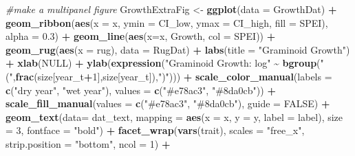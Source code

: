 \documentclass[
]{article}
\newenvironment{Shaded}{\begin{snugshade}}{\end{snugshade}}
\newcommand{\CommentTok}[1]{\textcolor[rgb]{0.56,0.35,0.01}{\textit{#1}}}
\newcommand{\DataTypeTok}[1]{\textcolor[rgb]{0.13,0.29,0.53}{#1}}
\newcommand{\DecValTok}[1]{\textcolor[rgb]{0.00,0.00,0.81}{#1}}
\newcommand{\FloatTok}[1]{\textcolor[rgb]{0.00,0.00,0.81}{#1}}
\newcommand{\KeywordTok}[1]{\textcolor[rgb]{0.13,0.29,0.53}{\textbf{#1}}}
\newcommand{\NormalTok}[1]{#1}
\newcommand{\OperatorTok}[1]{\textcolor[rgb]{0.81,0.36,0.00}{\textbf{#1}}}
\newcommand{\OtherTok}[1]{\textcolor[rgb]{0.56,0.35,0.01}{#1}}
\newcommand{\StringTok}[1]{\textcolor[rgb]{0.31,0.60,0.02}{#1}}
\begin{document}
\begin{Shaded}
\begin{Highlighting}[]
\CommentTok{\#make a multipanel figure}
\NormalTok{GrowthExtraFig \textless{}{-}}\StringTok{ }\KeywordTok{ggplot}\NormalTok{(}\DataTypeTok{data =}\NormalTok{ GrowthDat) }\OperatorTok{+}
\StringTok{  }\KeywordTok{geom\_ribbon}\NormalTok{(}\KeywordTok{aes}\NormalTok{(}\DataTypeTok{x =}\NormalTok{ x, }\DataTypeTok{ymin =}\NormalTok{ CI\_low, }\DataTypeTok{ymax =}\NormalTok{ CI\_high, }\DataTypeTok{fill =}\NormalTok{ SPEI), }\DataTypeTok{alpha =} \FloatTok{0.3}\NormalTok{) }\OperatorTok{+}
\StringTok{  }\KeywordTok{geom\_line}\NormalTok{(}\KeywordTok{aes}\NormalTok{(}\DataTypeTok{x=}\NormalTok{x, Growth, }\DataTypeTok{col =}\NormalTok{ SPEI))  }\OperatorTok{+}\StringTok{ }
\StringTok{  }\KeywordTok{geom\_rug}\NormalTok{(}\KeywordTok{aes}\NormalTok{(}\DataTypeTok{x =}\NormalTok{ rug), }\DataTypeTok{data =}\NormalTok{ RugDat) }\OperatorTok{+}
\StringTok{  }\KeywordTok{labs}\NormalTok{(}\DataTypeTok{title =} \StringTok{"Graminoid Growth"}\NormalTok{) }\OperatorTok{+}
\StringTok{  }\KeywordTok{xlab}\NormalTok{(}\OtherTok{NULL}\NormalTok{) }\OperatorTok{+}
\StringTok{  }\KeywordTok{ylab}\NormalTok{(}\KeywordTok{expression}\NormalTok{(}\StringTok{"Graminoid Growth: log"} \OperatorTok{\textasciitilde{}}\StringTok{ }\KeywordTok{bgroup}\NormalTok{(}\StringTok{"("}\NormalTok{,}\KeywordTok{frac}\NormalTok{(size[year\_t}\OperatorTok{+}\DecValTok{1}\NormalTok{],size[year\_t]),}\StringTok{")"}\NormalTok{)))  }\OperatorTok{+}
\StringTok{  }\KeywordTok{scale\_color\_manual}\NormalTok{(}\DataTypeTok{labels =} \KeywordTok{c}\NormalTok{(}\StringTok{"dry year"}\NormalTok{, }\StringTok{"wet year"}\NormalTok{), }\DataTypeTok{values =} \KeywordTok{c}\NormalTok{(}\StringTok{"\#e78ac3"}\NormalTok{, }\StringTok{"\#8da0cb"}\NormalTok{)) }\OperatorTok{+}
\StringTok{  }\KeywordTok{scale\_fill\_manual}\NormalTok{(}\DataTypeTok{values =} \KeywordTok{c}\NormalTok{(}\StringTok{"\#e78ac3"}\NormalTok{, }\StringTok{"\#8da0cb"}\NormalTok{), }\DataTypeTok{guide =} \OtherTok{FALSE}\NormalTok{) }\OperatorTok{+}
\StringTok{  }\KeywordTok{geom\_text}\NormalTok{(}\DataTypeTok{data=}\NormalTok{ dat\_text, }\DataTypeTok{mapping =} \KeywordTok{aes}\NormalTok{(}\DataTypeTok{x =}\NormalTok{ x, }\DataTypeTok{y =}\NormalTok{ y, }\DataTypeTok{label =}\NormalTok{ label), }\DataTypeTok{size =} \DecValTok{3}\NormalTok{, }\DataTypeTok{fontface =} \StringTok{"bold"}\NormalTok{) }\OperatorTok{+}
\StringTok{    }\KeywordTok{facet\_wrap}\NormalTok{(}\KeywordTok{vars}\NormalTok{(trait), }\DataTypeTok{scales =} \StringTok{"free\_x"}\NormalTok{, }\DataTypeTok{strip.position =}  \StringTok{"bottom"}\NormalTok{, }\DataTypeTok{ncol =} \DecValTok{1}\NormalTok{) }\OperatorTok{+}

\end{Highlighting}
\end{Shaded}
\end{document}
